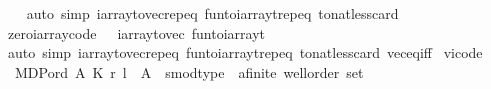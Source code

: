 \begin{isabellebody}
%
\isadelimproof
\ \ %
\endisadelimproof
%
\isatagproof
{}\isamarkupfalse%
\ {\isacharparenleft}{\kern0pt}auto\ simp{\isacharcolon}{\kern0pt}\ iarray{\isacharunderscore}{\kern0pt}to{\isacharunderscore}{\kern0pt}vec{\isachardot}{\kern0pt}rep{\isacharunderscore}{\kern0pt}eq\ fun{\isacharunderscore}{\kern0pt}to{\isacharunderscore}{\kern0pt}iarray{\isacharunderscore}{\kern0pt}t{\isachardot}{\kern0pt}rep{\isacharunderscore}{\kern0pt}eq\ to{\isacharunderscore}{\kern0pt}nat{\isacharunderscore}{\kern0pt}less{\isacharunderscore}{\kern0pt}card{\isacharparenright}{\kern0pt}%
\endisatagproof
{\isafoldproof}%
%
\isadelimproof
\isanewline
%
\endisadelimproof
\isanewline
{}\isamarkupfalse%
\ zero{\isacharunderscore}{\kern0pt}iarray{\isacharbrackleft}{\kern0pt}code{\isacharbrackright}{\kern0pt}{\isacharcolon}{\kern0pt}\ {\isachardoublequoteopen}{}\ {\isacharequal}{\kern0pt}\ iarray{\isacharunderscore}{\kern0pt}to{\isacharunderscore}{\kern0pt}vec\ {\isacharparenleft}{\kern0pt}fun{\isacharunderscore}{\kern0pt}to{\isacharunderscore}{\kern0pt}iarray{\isacharunderscore}{\kern0pt}t\ {}{\isacharparenright}{\kern0pt}{\isachardoublequoteclose}\isanewline
%
\isadelimproof
\ \ %
\endisadelimproof
%
\isatagproof
{}\isamarkupfalse%
\ {\isacharparenleft}{\kern0pt}auto\ simp{\isacharcolon}{\kern0pt}\ iarray{\isacharunderscore}{\kern0pt}to{\isacharunderscore}{\kern0pt}vec{\isachardot}{\kern0pt}rep{\isacharunderscore}{\kern0pt}eq\ fun{\isacharunderscore}{\kern0pt}to{\isacharunderscore}{\kern0pt}iarray{\isacharunderscore}{\kern0pt}t{\isachardot}{\kern0pt}rep{\isacharunderscore}{\kern0pt}eq\ to{\isacharunderscore}{\kern0pt}nat{\isacharunderscore}{\kern0pt}less{\isacharunderscore}{\kern0pt}card\ vec{\isacharunderscore}{\kern0pt}eq{\isacharunderscore}{\kern0pt}iff{\isacharparenright}{\kern0pt}%
\endisatagproof
{\isafoldproof}%
%
\isadelimproof
%
\endisadelimproof
%
\isadelimdocument
%
\endisadelimdocument
%
\isatagdocument
%
\isamarkuptrue%
%
\endisatagdocument
{\isafolddocument}%
%
\isadelimdocument
%
\endisadelimdocument
{}\isamarkupfalse%
\ vi{\isacharunderscore}{\kern0pt}code\ {\isacharequal}{\kern0pt}\ \isanewline
\ \ MDP{\isacharunderscore}{\kern0pt}ord\ A\ K\ r\ l\ \ A\ {\isacharcolon}{\kern0pt}{\isacharcolon}{\kern0pt}\ {\isachardoublequoteopen}{\isacharprime}{\kern0pt}s{\isacharcolon}{\kern0pt}{\isacharcolon}{\kern0pt}mod{\isacharunderscore}{\kern0pt}type\ {\isasymRightarrow}\ {\isacharparenleft}{\kern0pt}{\isacharprime}{\kern0pt}a{\isacharcolon}{\kern0pt}{\isacharcolon}{\kern0pt}{\isacharbraceleft}{\kern0pt}finite{\isacharcomma}{\kern0pt}\ wellorder{\isacharbraceright}{\kern0pt}{\isacharparenright}{\kern0pt}\ set{\isachardoublequoteclose}\ \isanewline

\end{isabellebody}
